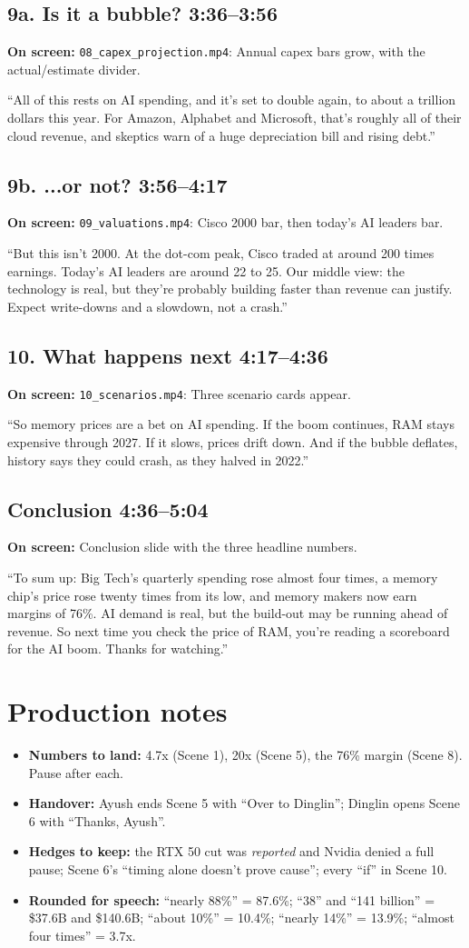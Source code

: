 \documentclass[11pt]{article}
\newcommand{\scene}[4]{%
  \needspace{7\baselineskip}\subsection*{#1 \hfill {\normalfont\color{muted}\small #2}}
  {\small\color{muted}\textbf{On screen:} #3}\par\vspace{-0.2em}
  \begin{keybox}#4\end{keybox}}
\begin{document}
\scene{9a. Is it a bubble?}{3:36--3:56}
{\texttt{08\_capex\_projection.mp4}: Annual capex bars grow, with the actual/estimate divider.}
{``All of this rests on AI spending, and it's set to double again, to about a trillion dollars this year. For Amazon, Alphabet and Microsoft, that's roughly all of their cloud revenue, and skeptics warn of a huge depreciation bill and rising debt.''}

\scene{9b. ...or not?}{3:56--4:17}
{\texttt{09\_valuations.mp4}: Cisco 2000 bar, then today's AI leaders bar.}
{``But this isn't 2000. At the dot-com peak, Cisco traded at around 200 times earnings. Today's AI leaders are around 22 to 25. Our middle view: the technology is real, but they're probably building faster than revenue can justify. Expect write-downs and a slowdown, not a crash.''}

\scene{10. What happens next}{4:17--4:36}
{\texttt{10\_scenarios.mp4}: Three scenario cards appear.}
{``So memory prices are a bet on AI spending. If the boom continues, RAM stays expensive through 2027. If it slows, prices drift down. And if the bubble deflates, history says they could crash, as they halved in 2022.''}

\scene{Conclusion}{4:36--5:04}
{Conclusion slide with the three headline numbers.}
{``To sum up: Big Tech's quarterly spending rose almost four times, a memory chip's price rose twenty times from its low, and memory makers now earn margins of 76\%. AI demand is real, but the build-out may be running ahead of revenue. So next time you check the price of RAM, you're reading a scoreboard for the AI boom. Thanks for watching.''}

\section*{Production notes}
\begin{itemize}
  \item \textbf{Numbers to land:} 4.7x (Scene 1), 20x (Scene 5), the 76\% margin (Scene 8). Pause after each.
  \item \textbf{Handover:} Ayush ends Scene 5 with ``Over to Dinglin''; Dinglin opens Scene 6 with ``Thanks, Ayush''.
  \item \textbf{Hedges to keep:} the RTX 50 cut was \emph{reported} and Nvidia denied a full pause; Scene 6's ``timing alone doesn't prove cause''; every ``if'' in Scene 10.
  \item \textbf{Rounded for speech:} ``nearly 88\%'' = 87.6\%; ``38'' and ``141 billion'' = \$37.6B and \$140.6B; ``about 10\%'' = 10.4\%; ``nearly 14\%'' = 13.9\%; ``almost four times'' = 3.7x.
\end{itemize}
\end{document}

